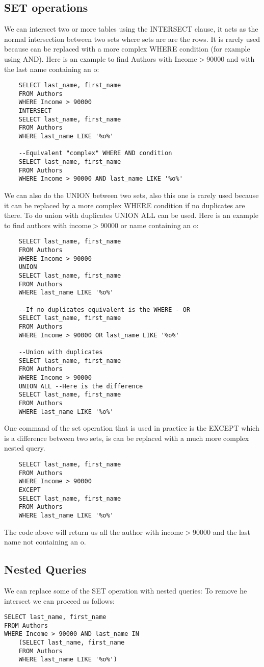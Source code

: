 \documentclass[a4page, 11pt]{article}
\begin{document}
\subsection{SET operations}
We can intersect two or more tables using the INTERSECT clause, it acts as the normal intersection between two sets where sets are are the rows. 
It is rarely used because can be replaced with a more complex WHERE condition (for example using AND). 
Here is an example to find Authors with Income$>$90000 and with the last name containing an o:
\begin{lstlisting}
	SELECT last_name, first_name
	FROM Authors
	WHERE Income > 90000
	INTERSECT 
	SELECT last_name, first_name
	FROM Authors
	WHERE last_name LIKE '%o%' 
	
	--Equivalent "complex" WHERE AND condition
	SELECT last_name, first_name
	FROM Authors
	WHERE Income > 90000 AND last_name LIKE '%o%'
\end{lstlisting}
We can also do the UNION between two sets, also this one is rarely used because it can be replaced by a more complex WHERE condition if no duplicates are there. To do union with duplicates UNION ALL can be used. 
Here is an example to find authors with income$>$90000 or name containing an o:
\begin{lstlisting}
	SELECT last_name, first_name
	FROM Authors
	WHERE Income > 90000
	UNION 
	SELECT last_name, first_name
	FROM Authors
	WHERE last_name LIKE '%o%' 
	
	--If no duplicates equivalent is the WHERE - OR
	SELECT last_name, first_name
	FROM Authors
	WHERE Income > 90000 OR last_name LIKE '%o%'
	
	--Union with duplicates
	SELECT last_name, first_name
	FROM Authors
	WHERE Income > 90000
	UNION ALL --Here is the difference
	SELECT last_name, first_name
	FROM Authors
	WHERE last_name LIKE '%o%' 
\end{lstlisting}

One command of the set operation that is used in practice is the EXCEPT which is a difference between two sets, is can be replaced with a much more complex nested query.
\begin{lstlisting}
	SELECT last_name, first_name
	FROM Authors
	WHERE Income > 90000
	EXCEPT 
	SELECT last_name, first_name
	FROM Authors
	WHERE last_name LIKE '%o%' 
\end{lstlisting}
The code above will return us all the author with income$>$90000 and the last name not containing an o.

\subsection{Nested Queries}
We can replace some of the SET operation with nested queries:\newline
To remove he intersect we can proceed as follows:
\begin{lstlisting}
SELECT last_name, first_name
FROM Authors
WHERE Income > 90000 AND last_name IN 
	(SELECT last_name, first_name
	FROM Authors
	WHERE last_name LIKE '%o%')
\end{lstlisting}
\end{document}
